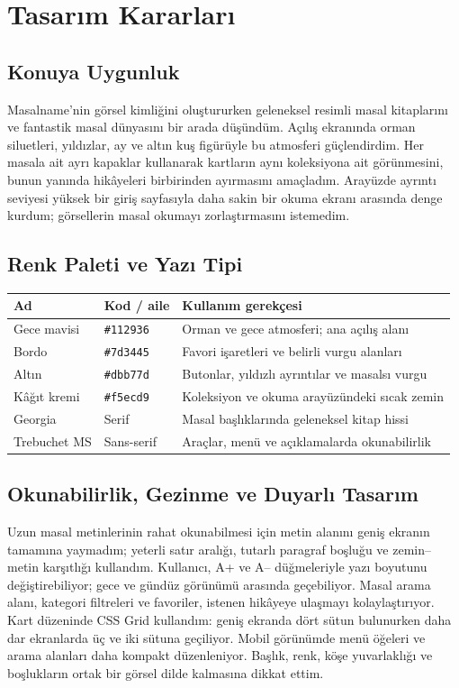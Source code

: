 \documentclass[10pt,a4paper]{article}
\begin{document}
\section{Tasarım Kararları}
\subsection{Konuya Uygunluk}
Masalname'nin görsel kimliğini oluştururken geleneksel resimli masal kitaplarını ve fantastik masal dünyasını bir arada düşündüm. Açılış ekranında orman siluetleri, yıldızlar, ay ve altın kuş figürüyle bu atmosferi güçlendirdim. Her masala ait ayrı kapaklar kullanarak kartların aynı koleksiyona ait görünmesini, bunun yanında hikâyeleri birbirinden ayırmasını amaçladım. Arayüzde ayrıntı seviyesi yüksek bir giriş sayfasıyla daha sakin bir okuma ekranı arasında denge kurdum; görsellerin masal okumayı zorlaştırmasını istemedim.
\subsection{Renk Paleti ve Yazı Tipi}
\par\medskip\noindent\begin{tabularx}{\textwidth}{@{}l l X@{}}\toprule Ad & Kod / aile & Kullanım gerekçesi \\ \midrule
Gece mavisi & \texttt{\#112936} & Orman ve gece atmosferi; ana açılış alanı \\
Bordo & \texttt{\#7d3445} & Favori işaretleri ve belirli vurgu alanları \\
Altın & \texttt{\#dbb77d} & Butonlar, yıldızlı ayrıntılar ve masalsı vurgu \\
Kâğıt kremi & \texttt{\#f5ecd9} & Koleksiyon ve okuma arayüzündeki sıcak zemin \\
Georgia & Serif & Masal başlıklarında geleneksel kitap hissi \\
Trebuchet MS & Sans-serif & Araçlar, menü ve açıklamalarda okunabilirlik \\
\bottomrule\end{tabularx}
\subsection{Okunabilirlik, Gezinme ve Duyarlı Tasarım}
Uzun masal metinlerinin rahat okunabilmesi için metin alanını geniş ekranın tamamına yaymadım; yeterli satır aralığı, tutarlı paragraf boşluğu ve zemin--metin karşıtlığı kullandım. Kullanıcı, A+ ve A-- düğmeleriyle yazı boyutunu değiştirebiliyor; gece ve gündüz görünümü arasında geçebiliyor. Masal arama alanı, kategori filtreleri ve favoriler, istenen hikâyeye ulaşmayı kolaylaştırıyor. Kart düzeninde CSS Grid kullandım: geniş ekranda dört sütun bulunurken daha dar ekranlarda üç ve iki sütuna geçiliyor. Mobil görünümde menü öğeleri ve arama alanları daha kompakt düzenleniyor. Başlık, renk, köşe yuvarlaklığı ve boşlukların ortak bir görsel dilde kalmasına dikkat ettim.
\end{document}
